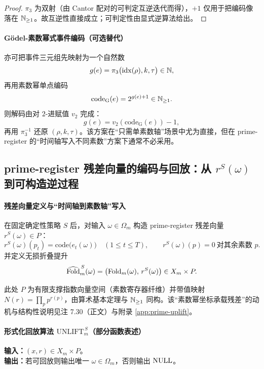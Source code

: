 \begin{proof}
$\pi_3$ 为双射（由 Cantor 配对的可判定互逆迭代而得），$+1$ 仅用于把编码像落在 $\mathbb{N}_{\ge 1}$。故互逆性直接成立；可判定性由显式逆算法给出。
\end{proof}

\paragraph{Gödel-素数幂式事件编码（可选替代）}
亦可把事件三元组先映射为一个自然数
$$
g(e)=\pi_3\bigl(\mathrm{idx}(\rho),k,\tau\bigr)\in\mathbb{N},
$$
再用素数幂单点编码
$$
\mathrm{code}_{\mathrm{G}}(e)=2^{g(e)+1}\in\mathbb{N}_{\ge 1}.
$$
则解码由对 $2$-进赋值 $v_2$ 完成：
$$
g(e)=v_2(\mathrm{code}_{\mathrm{G}}(e))-1,
$$
再用 $\pi_3^{-1}$ 还原 $(\rho,k,\tau)$。该方案在“只需单素数轴”场景中尤为直接，但在 prime-register 的“时间轴写入不同素数”方案下通常不必采用。

\subsection{prime-register 残差向量的编码与回放：从 \texorpdfstring{$r^S(\omega)$}{r^S(omega)} 到可构造逆过程}

\paragraph{残差向量定义与“时间轴到素数轴”写入}
在固定确定性策略 $S$ 后，对输入 $\omega\in\Omega_m$ 构造 prime-register 残差向量 $r^S(\omega)\in P$：
$$
r^S(\omega)(p_t)=\mathrm{code}\bigl(e_t(\omega)\bigr)\quad (1\le t\le T),
\qquad r^S(\omega)(p)=0\ \text{对其余素数 }p.
$$
并定义无损折叠提升
$$
\widehat{\mathrm{Fold}}_m^{\,S}(\omega)=\bigl(\mathrm{Fold}_m(\omega),\,r^S(\omega)\bigr)\in X_m\times P.
$$

此处 $P$ 为有限支撑指数向量空间（素数寄存器纤维）并带值映射 $N(r)=\prod_p p^{r(p)}$，由算术基本定理与 $\mathbb{N}_{\ge 1}$ 同构。该“素数幂坐标承载残差”的动机与结构性说明见注 7.30（正文）与附录 \ref{app:prime-uplift}。

\paragraph{形式化回放算法 \texorpdfstring{$\mathrm{UNLIFT}_m^{\,S}$}{UNLIFT\_m^S}（部分函数表述）}
\textbf{输入：}$(x,r)\in X_m\times P$。\\
\textbf{输出：}若可回放则输出唯一 $\omega\in\Omega_m$，否则输出 $\mathrm{NULL}$。

